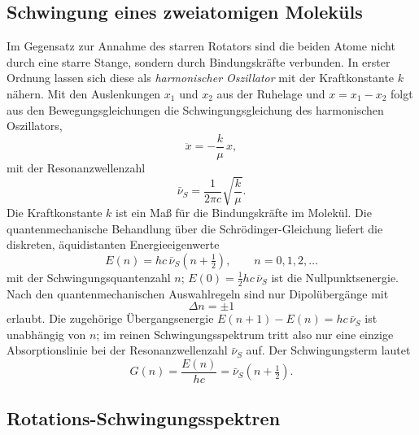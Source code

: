 \documentclass[11pt,a4paper]{article}
\newcommand{\wzs}{\ensuremath{\bar{\nu}_S}}        %
\begin{document}
\subsection{Schwingung eines zweiatomigen Moleküls}
\label{sec:schwingung}

Im Gegensatz zur Annahme des starren Rotators sind die beiden Atome nicht durch
eine starre Stange, sondern durch Bindungskräfte verbunden. In erster Ordnung
lassen sich diese als \emph{harmonischer Oszillator} mit der Kraftkonstante $k$
nähern. Mit den Auslenkungen $x_1$ und $x_2$ aus der Ruhelage und $x = x_1 - x_2$
folgt aus den Bewegungsgleichungen die Schwingungsgleichung des harmonischen
Oszillators,
\begin{equation}
  \ddot{x} = -\frac{k}{\mu}\,x ,
\end{equation}
mit der Resonanzwellenzahl
\begin{equation}
  \wzs = \frac{1}{2\pi c}\sqrt{\frac{k}{\mu}} .
  \label{eq:nus}
\end{equation}
Die Kraftkonstante $k$ ist ein Maß für die Bindungskräfte im Molekül. Die
quantenmechanische Behandlung über die Schrödinger-Gleichung liefert die
diskreten, äquidistanten Energieeigenwerte
\begin{equation}
  E(n) = hc\,\wzs\left(n + \tfrac{1}{2}\right), \qquad n = 0,1,2,\dots
  \label{eq:eschwing}
\end{equation}
mit der Schwingungsquantenzahl $n$; $E(0) = \tfrac{1}{2}hc\,\wzs$ ist die
Nullpunktsenergie. Nach den quantenmechanischen Auswahlregeln sind nur
Dipolübergänge mit
\begin{equation}
  \Delta n = \pm 1
  \label{eq:auswahlschwing}
\end{equation}
erlaubt. Die zugehörige Übergangsenergie $E(n+1) - E(n) = hc\,\wzs$ ist
unabhängig von $n$; im reinen Schwingungsspektrum tritt also nur eine einzige
Absorptionslinie bei der Resonanzwellenzahl \wzs{} auf. Der Schwingungsterm
lautet
\begin{equation}
  G(n) = \frac{E(n)}{hc} = \wzs\left(n + \tfrac{1}{2}\right) .
  \label{eq:Gn}
\end{equation}

\subsection{Rotations-Schwingungsspektren}
\label{sec:rotvib}
\end{document}
